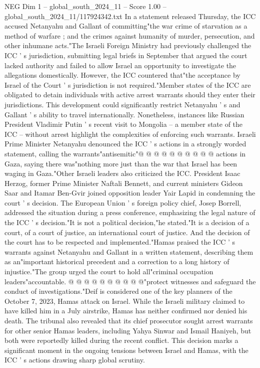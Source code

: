 \begin{textsample}{NEG Dim 1 – global\_south\_2024\_11 – Score 1.00 – global\_south\_2024\_11/117924342.txt}  \label{ex:f1_neg_206}
In a statement released Thursday, the ICC accused Netanyahu and Gallant of committing"the war crime of starvation as a method of warfare ; and the crimes against humanity of murder, persecution, and other inhumane acts."The Israeli Foreign Ministry had previously challenged the ICC ' s jurisdiction, submitting legal briefs in September that argued the court lacked authority and failed to allow Israel an opportunity to investigate the allegations domestically.
However, the ICC countered that"the acceptance by Israel of the Court ' s jurisdiction is not required."Member states of the ICC are obligated to detain individuals with active arrest warrants should they enter their jurisdictions.
This development could significantly restrict Netanyahu ' s and Gallant ' s ability to travel internationally.
Nonetheless, instances like Russian President Vladimir Putin ' s recent visit to Mongolia -- a member state of the ICC -- without arrest highlight the complexities of enforcing such warrants.
Israeli Prime Minister Netanyahu denounced the ICC ' s actions in a strongly worded statement, calling the warrants"antisemitic"@ @ @ @ @ @ @ @ @ @ actions in Gaza, saying there was"nothing more just than the war that Israel has been waging in Gaza."Other Israeli leaders also criticized the ICC.
President Isaac Herzog, former Prime Minister Naftali Bennett, and current ministers Gideon Saar and Itamar Ben-Gvir joined opposition leader Yair Lapid in condemning the court ' s decision.
The European Union ' s foreign policy chief, Josep Borrell, addressed the situation during a press conference, emphasizing the legal nature of the ICC ' s decision."It is not a political decision,"he stated."It is a decision of a court, of a court of justice, an international court of justice.
And the decision of the court has to be respected and implemented."Hamas praised the ICC ' s warrants against Netanyahu and Gallant in a written statement, describing them as an"important historical precedent and a correction to a long history of injustice."The group urged the court to hold all"criminal occupation leaders"accountable. @ @ @ @ @ @ @ @ @ @"protect witnesses and safeguard the conduct of investigations."Deif is considered one of the key planners of the October 7, 2023, Hamas attack on Israel.
While the Israeli military claimed to have killed him in a July airstrike, Hamas has neither confirmed nor denied his death.
The tribunal also revealed that its chief prosecutor sought arrest warrants for other senior Hamas leaders, including Yahya Sinwar and Ismail Haniyeh, but both were reportedly killed during the recent conflict.
This decision marks a significant moment in the ongoing tensions between Israel and Hamas, with the ICC ' s actions drawing sharp global scrutiny.

\end{textsample}
